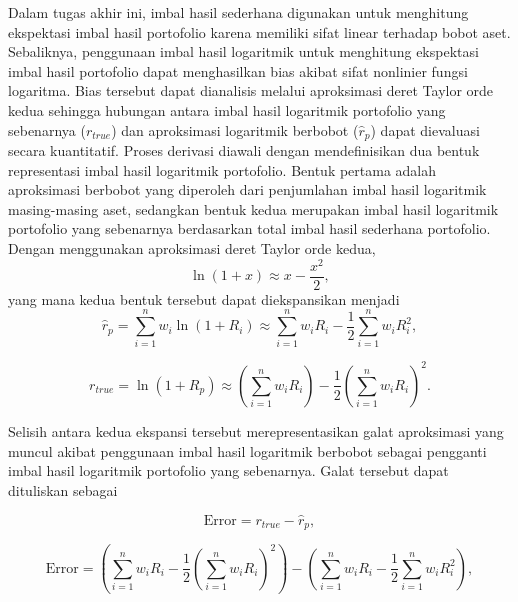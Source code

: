 Dalam tugas akhir ini, imbal hasil sederhana digunakan untuk menghitung ekspektasi imbal hasil portofolio karena memiliki sifat linear terhadap bobot aset. Sebaliknya, penggunaan imbal hasil logaritmik untuk menghitung ekspektasi imbal hasil portofolio dapat menghasilkan bias akibat sifat nonlinier fungsi logaritma. Bias tersebut dapat dianalisis melalui aproksimasi deret Taylor orde kedua sehingga hubungan antara imbal hasil logaritmik portofolio yang sebenarnya ($r_{true}$) dan aproksimasi logaritmik berbobot ($\hat{r}_p$) dapat dievaluasi secara kuantitatif. Proses derivasi diawali dengan mendefinisikan dua bentuk representasi imbal hasil logaritmik portofolio. Bentuk pertama adalah aproksimasi berbobot yang diperoleh dari penjumlahan imbal hasil logaritmik masing-masing aset, sedangkan bentuk kedua merupakan imbal hasil logaritmik portofolio yang sebenarnya berdasarkan total imbal hasil sederhana portofolio. Dengan menggunakan aproksimasi deret Taylor orde kedua,
\begin{equation}
\ln(1+x)\approx x-\frac{x^2}{2},
\end{equation}
yang mana kedua bentuk tersebut dapat diekspansikan menjadi
\begin{equation}
\hat{r}_p = \sum_{i=1}^{n} w_i \ln(1+R_i)
\approx
\sum_{i=1}^{n} w_i R_i
-
\frac{1}{2}
\sum_{i=1}^{n} w_i R_i^2 ,
\end{equation}

\begin{equation}
r_{true}
=
\ln(1+R_p)
\approx
\left(
\sum_{i=1}^{n} w_i R_i
\right)
-
\frac{1}{2}
\left(
\sum_{i=1}^{n} w_i R_i
\right)^2 .
\end{equation}

Selisih antara kedua ekspansi tersebut merepresentasikan galat aproksimasi yang muncul akibat penggunaan imbal hasil logaritmik berbobot sebagai pengganti imbal hasil logaritmik portofolio yang sebenarnya. Galat tersebut dapat dituliskan sebagai

\begin{equation*}
\text{Error}=r_{true}-\hat{r}_p,
\end{equation*}

\begin{equation*}
\text{Error}
= \left(
\sum_{i=1}^{n} w_i R_i - \frac{1}{2} \left( \sum_{i=1}^{n} w_i R_i \right)^2 \right) - \left( \sum_{i=1}^{n} w_i R_i - \frac{1}{2} \sum_{i=1}^{n} w_i R_i^2 \right),
\end{equation*}

